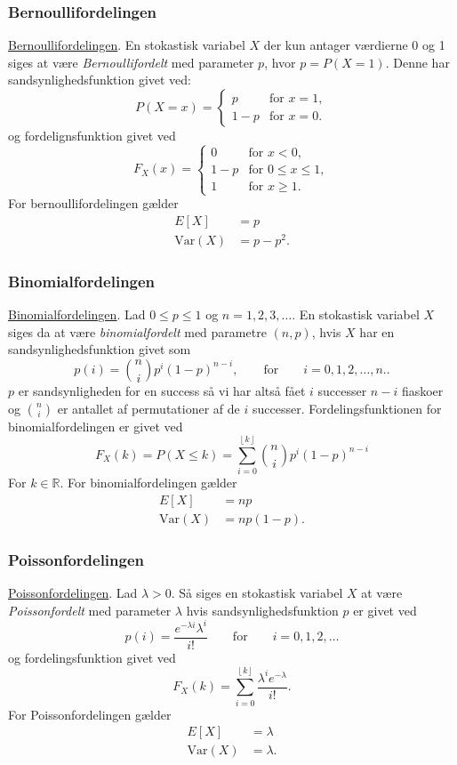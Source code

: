 \subsubsection{Bernoullifordelingen}
\underline{\hyperref[afs:forber]{Bernoullifordelingen}}. En stokastisk variabel $X$ der kun antager værdierne 0 og 1 siges at være \textit{Bernoullifordelt} med parameter $p$, hvor $p = P(X = 1)$. Denne har sandsynlighedsfunktion givet ved:
\[ 
P(X = x) = \begin{cases}
p & \text{for } x = 1, \\
1 - p & \text{for } x = 0
.\end{cases}
\]
og fordelignsfunktion givet ved
\[ 
F_X(x) = \begin{cases}
0 & \text{for } x < 0, \\
1 - p & \text{for } 0 \leq x \leq 1, \\
1 & \text{for } x \geq 1
.\end{cases}
\]
For bernoullifordelingen gælder
\begin{align*}
  E[X] &= p \\
  \mathrm{Var}(X) &= p - p^2
.\end{align*}


\subsubsection{Binomialfordelingen}
\underline{\hyperref[afs:forbin]{Binomialfordelingen}}. Lad $0 \leq p \leq 1$ og $n = 1, 2, 3, \ldots$. En stokastisk variabel $X$ siges da at være \textit{binomialfordelt} med parametre $(n,p)$, hvis $X$ har en sandsynlighedsfunktion givet som
\[ 
p(i) = \binom{n}{i}p^{i}(1-p)^{n-i}, \qquad \text{for} \qquad i = 0, 1, 2, \ldots , n.
.\]
$p$ er sandsynligheden for en success så vi har altså fået $i$ successer $n-i$ fiaskoer og $\binom{n}{i}$ er antallet af permutationer af de $i$ successer. 
Fordelingsfunktionen for binomialfordelingen er givet ved
\[ 
F_X(k) = P(X \leq k) = \sum_{i = 0}^{\left\lfloor k \right\rfloor} \binom{n}{i} p^{i}(1-p)^{n-i}
\]
For $k \in \mathbb{R}$.
For binomialfordelingen gælder
\begin{align*}
  E[X] &= np \\
  \mathrm{Var}(X) &= np(1-p)
.\end{align*}



\subsubsection{Poissonfordelingen}
\underline{\hyperref[afs:forpoi]{Poissonfordelingen}}. Lad $\lambda >0$. Så siges en stokastisk variabel $X$ at være \textit{Poissonfordelt} med parameter $\lambda$ hvis sandsynlighedsfunktion $p$ er givet ved
\[ 
p(i) = \frac{e^{-\lambda i} \lambda^{i}}{i!} \qquad \text{for} \qquad i = 0, 1, 2,\ldots 
\]
og fordelingsfunktion givet ved
\[ 
F_X(k) = \sum_{i = 0}^{\left\lfloor k \right\rfloor } \frac{\lambda^{i}e^{-\lambda}}{i!}
.\]
For Poissonfordelingen gælder
\begin{align*}
  E[X] &= \lambda \\
  \mathrm{Var}(X) &= \lambda
.\end{align*}


